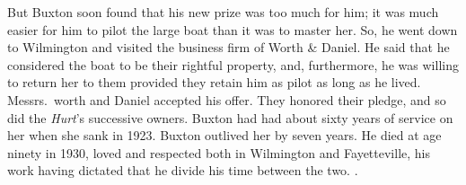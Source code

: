 \documentclass[11pt, a5paper, openright]{book}
\begin{document}
But Buxton soon found that his new prize was too much for him; it was
much easier for him to pilot the large boat than it was to master her.
So, he went down to Wilmington and visited the business firm of Worth
\& Daniel.  He said that he considered the boat to be their rightful
property, and, furthermore, he was willing to return her to them
provided they retain him as pilot as long as he lived.  Messrs.\ worth
and Daniel accepted his offer.  They honored their pledge, and so did
the \textit{Hurt}'s successive owners.  Buxton had had about sixty
years of service on her when she sank in 1923.  Buxton outlived her by
seven years.  He died at age ninety in 1930, loved and respected both
in Wilmington and Fayetteville, his work having dictated that he
divide his time between the two.  \citep[6-12-1934]{wn}.\par
\end{document}
